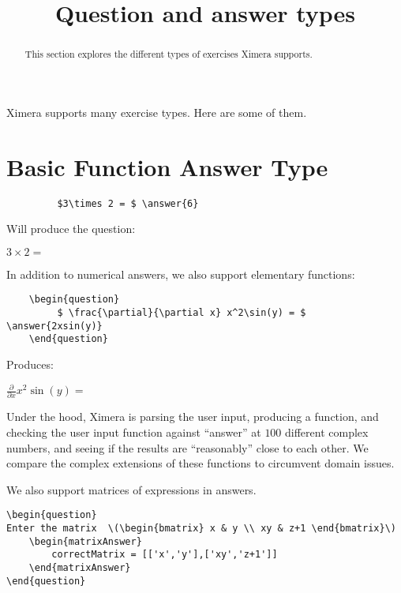 \documentclass{ximera}
\title{Question and answer types}
\begin{document}
\begin{abstract}
  This section explores the different types of exercises Ximera supports. 
\end{abstract}

\maketitle

Ximera supports many exercise types. Here are some of them.


\section{Basic Function Answer Type}

\begin{verbatim}
         $3\times 2 = $ \answer{6}
\end{verbatim}

Will produce the question:

\begin{question}
  $3\times 2 = $ 
\end{question}


In addition to numerical answers, we also support elementary functions:

\begin{verbatim}
    \begin{question}
         $ \frac{\partial}{\partial x} x^2\sin(y) = $ \answer{2xsin(y)}
    \end{question}
\end{verbatim}

Produces:

\begin{question}
  $ \frac{\partial}{\partial x} x^2\sin(y) = $ 
\end{question}

\begin{remark}
Under the hood, Ximera is parsing the user input, producing a
function, and checking the user input function against ``answer'' at
$100$ different complex numbers, and seeing if the results are
``reasonably'' close to each other.  We compare the complex extensions
of these functions to circumvent domain issues.
\end{remark}

We also support matrices of expressions in answers.

\begin{verbatim}
\begin{question}
Enter the matrix  \(\begin{bmatrix} x & y \\ xy & z+1 \end{bmatrix}\)
    \begin{matrixAnswer}
	    correctMatrix = [['x','y'],['xy','z+1']]
    \end{matrixAnswer}
\end{question}
\end{verbatim}
\end{document}
